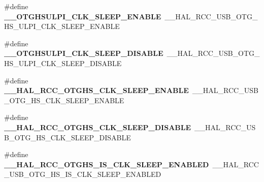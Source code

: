 \begin{DoxyCompactItemize}
\item 
\hypertarget{group___h_a_l___r_c_c___aliased_gab87bb1271d72ce25a81fdd16cae6c0c9}{\#define {\bfseries \-\_\-\-\_\-\-O\-T\-G\-H\-S\-U\-L\-P\-I\-\_\-\-C\-L\-K\-\_\-\-S\-L\-E\-E\-P\-\_\-\-E\-N\-A\-B\-L\-E}~\-\_\-\-\_\-\-H\-A\-L\-\_\-\-R\-C\-C\-\_\-\-U\-S\-B\-\_\-\-O\-T\-G\-\_\-\-H\-S\-\_\-\-U\-L\-P\-I\-\_\-\-C\-L\-K\-\_\-\-S\-L\-E\-E\-P\-\_\-\-E\-N\-A\-B\-L\-E}\label{group___h_a_l___r_c_c___aliased_gab87bb1271d72ce25a81fdd16cae6c0c9}

\item 
\hypertarget{group___h_a_l___r_c_c___aliased_ga0e57c00bbe387c32eab17d0bd990a314}{\#define {\bfseries \-\_\-\-\_\-\-O\-T\-G\-H\-S\-U\-L\-P\-I\-\_\-\-C\-L\-K\-\_\-\-S\-L\-E\-E\-P\-\_\-\-D\-I\-S\-A\-B\-L\-E}~\-\_\-\-\_\-\-H\-A\-L\-\_\-\-R\-C\-C\-\_\-\-U\-S\-B\-\_\-\-O\-T\-G\-\_\-\-H\-S\-\_\-\-U\-L\-P\-I\-\_\-\-C\-L\-K\-\_\-\-S\-L\-E\-E\-P\-\_\-\-D\-I\-S\-A\-B\-L\-E}\label{group___h_a_l___r_c_c___aliased_ga0e57c00bbe387c32eab17d0bd990a314}

\item 
\hypertarget{group___h_a_l___r_c_c___aliased_ga33ebf3c332b4cc9093720cd9959a57c3}{\#define {\bfseries \-\_\-\-\_\-\-H\-A\-L\-\_\-\-R\-C\-C\-\_\-\-O\-T\-G\-H\-S\-\_\-\-C\-L\-K\-\_\-\-S\-L\-E\-E\-P\-\_\-\-E\-N\-A\-B\-L\-E}~\-\_\-\-\_\-\-H\-A\-L\-\_\-\-R\-C\-C\-\_\-\-U\-S\-B\-\_\-\-O\-T\-G\-\_\-\-H\-S\-\_\-\-C\-L\-K\-\_\-\-S\-L\-E\-E\-P\-\_\-\-E\-N\-A\-B\-L\-E}\label{group___h_a_l___r_c_c___aliased_ga33ebf3c332b4cc9093720cd9959a57c3}

\item 
\hypertarget{group___h_a_l___r_c_c___aliased_ga3e46182659039e69ad95eada6df0261e}{\#define {\bfseries \-\_\-\-\_\-\-H\-A\-L\-\_\-\-R\-C\-C\-\_\-\-O\-T\-G\-H\-S\-\_\-\-C\-L\-K\-\_\-\-S\-L\-E\-E\-P\-\_\-\-D\-I\-S\-A\-B\-L\-E}~\-\_\-\-\_\-\-H\-A\-L\-\_\-\-R\-C\-C\-\_\-\-U\-S\-B\-\_\-\-O\-T\-G\-\_\-\-H\-S\-\_\-\-C\-L\-K\-\_\-\-S\-L\-E\-E\-P\-\_\-\-D\-I\-S\-A\-B\-L\-E}\label{group___h_a_l___r_c_c___aliased_ga3e46182659039e69ad95eada6df0261e}

\item 
\hypertarget{group___h_a_l___r_c_c___aliased_gadad70bfa003e6cd32f8d16102216c02e}{\#define {\bfseries \-\_\-\-\_\-\-H\-A\-L\-\_\-\-R\-C\-C\-\_\-\-O\-T\-G\-H\-S\-\_\-\-I\-S\-\_\-\-C\-L\-K\-\_\-\-S\-L\-E\-E\-P\-\_\-\-E\-N\-A\-B\-L\-E\-D}~\-\_\-\-\_\-\-H\-A\-L\-\_\-\-R\-C\-C\-\_\-\-U\-S\-B\-\_\-\-O\-T\-G\-\_\-\-H\-S\-\_\-\-I\-S\-\_\-\-C\-L\-K\-\_\-\-S\-L\-E\-E\-P\-\_\-\-E\-N\-A\-B\-L\-E\-D}\label{group___h_a_l___r_c_c___aliased_gadad70bfa003e6cd32f8d16102216c02e}


\end{DoxyCompactItemize}

